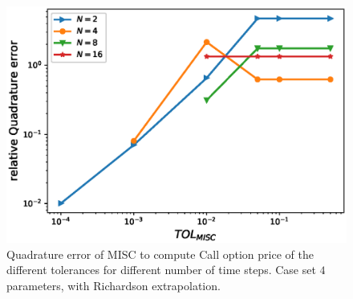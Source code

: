 \documentclass[11pt]{article}
\begin{document}
\begin{figure}[h!]
	\centering
	\includegraphics[width=0.7\linewidth]{./figures/rBergomi_MISC_quadratre_error/vs_TOL/set4/relative_quad_error_wrt_MISC_TOL_set4_with_rich}
	
	
	\caption{Quadrature error of MISC to compute Call option price of the different tolerances for different number of time steps. Case set $4$ parameters, with Richardson extrapolation.}
	\label{fig:Quadrature_error_set4_rich}
\end{figure}
\end{document}
